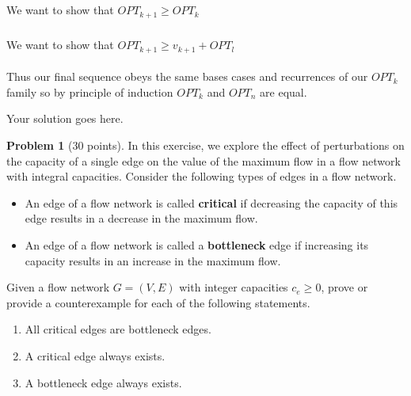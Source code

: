\documentclass[10pt]{article}
\theoremstyle{definition}
\newtheorem{problem}{\sc\color{cit}Problem}
\begin{document}
{\subparagraph{} We want to show that $OPT_{k+1} \geq OPT_k$

\subparagraph{} We want to show that $OPT_{k+1} \geq v_{k+1} + OPT_l$

\paragraph{} Thus our final sequence obeys the same bases cases and recurrences of our $OPT_k$ family so by 
principle of induction $OPT_k$ and $OPT_n$ are equal. 


  Your solution goes here.
}

\newpage
\medskip{}

\newpage
\begin{problem}[30 points]
In this exercise, we explore the effect of perturbations on the capacity of a single edge on the value of the maximum flow in a flow network with integral capacities. Consider the following types of edges in a flow network.
\begin{itemize}
\item An edge of a flow network is called {\bf critical} if decreasing the capacity of this edge results in a decrease in the maximum flow.

\item An edge of a flow network is called a {\bf bottleneck} edge if increasing its capacity results in an increase in the maximum flow.
\end{itemize}

Given a flow network $G = (V, E)$ with integer capacities $c_e \geq 0$, prove or provide a counterexample for each of the following statements.
\begin{enumerate}[label=(\alph*),leftmargin=2\parindent]
\item All critical edges are bottleneck edges.

\item A critical edge always exists.

\item A bottleneck edge always exists.
\end{enumerate}
\end{problem}
\end{document}
